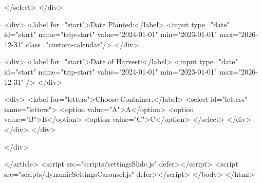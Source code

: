 \documentclass[12pt]{article} %
\begin{document}
\begin{htmlcode}[caption={Settings Page HTML}]
                        </select>
                    </div>
    
                    <div>
                        <label for="start">Date Planted:</label>
                        <input type="date" id="start" name="trip-start" value="2024-01-01" min="2023-01-01" max="2026-12-31" class="custom-calendar"/>
                    </div>
                    
                    <div>
                        <label for="start">Date of Harvest:</label>
                        <input type="date" id="start" name="trip-start" value="2024-01-01" min="2023-01-01" max="2026-12-31" />
                    </div>
                
                    <div>
                        <label for="letters">Choose Container:</label>
                        <select id="letters" name="letters">
                                <option value="A">A</option>
                                <option value="B">B</option>
                                <option value="C">C</option>
                        </select>
                    </div>
                </div>
            </div>
    
        </div>
    
    </article>
    <script src="scripts/settingsSlide.js"  defer></script>
    <script src="scripts/dynamicSettingsCarousel.js"  defer></script>
    </body>
    </html>
    
    \end{htmlcode}
    
    \pagebreak
    
\end{document}
